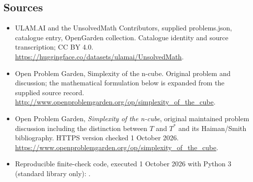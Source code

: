 \documentclass[11pt,a4paper]{article}
\begin{document}
\subsection{Sources}
\begin{itemize}
\item[S1] ULAM.AI and the UnsolvedMath Contributors, supplied problems.json, catalogue entry, OpenGarden collection. Catalogue identity and source transcription; CC BY 4.0.
\url{https://huggingface.co/datasets/ulamai/UnsolvedMath}.
\item[S2] Open Problem Garden, Simplexity of the n-cube. Original problem and discussion; the mathematical formulation below is expanded from the supplied source record.
\url{http://www.openproblemgarden.org/op/simplexity_of_the_cube}.
\item[S3] Open Problem Garden, \emph{Simplexity of the n-cube}, original maintained problem discussion including the distinction between $T$ and $T^*$ and its Haiman/Smith bibliography. HTTPS version checked 1 October 2026.
\url{https://www.openproblemgarden.org/op/simplexity_of_the_cube}.
\item[C1] Reproducible finite-check code, executed 1 October 2026 with Python 3 (standard library only):
.
\end{itemize}
\end{document}
